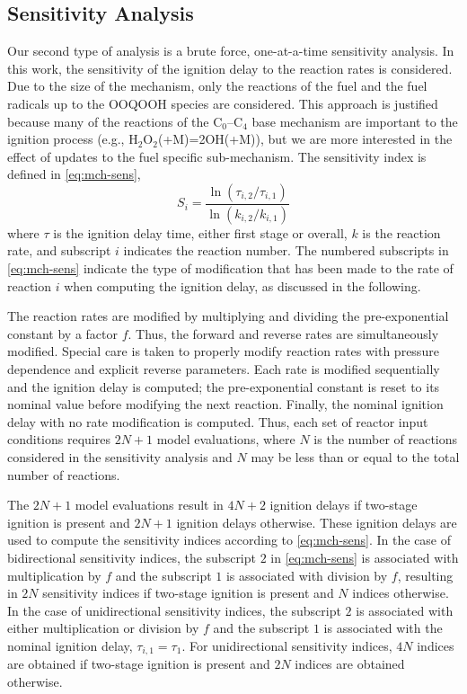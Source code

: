 \documentclass[../main.tex]{subfiles}
\begin{document}
\subsection{Sensitivity Analysis}
\label{sec:mch-sensitivity-analysis}

Our second type of analysis is a brute force, one-at-a-time sensitivity
analysis. In this work, the sensitivity of the ignition delay to the reaction
rates is considered. Due to the size of the mechanism, only the reactions of
the fuel and the fuel radicals up to the OOQOOH species are considered. This
approach is justified because many of the reactions of the C$_0$--C$_4$ base
mechanism are important to the ignition process (e.g.,
H$_2$O$_2$(+M)=2OH(+M)), but we are more interested in the effect of updates to
the fuel specific sub-mechanism. The sensitivity index is defined in
\cref{eq:mch-sens},
%
\begin{equation}
    \label{eq:mch-sens}
    S_i = \frac{\ln\left(\tau_{i,2}/\tau_{i,1}\right)}{\ln\left(k_{i,2}/k_{i,1}\right)}
\end{equation}
%
where $\tau$ is the ignition delay time, either first stage or overall, $k$ is
the reaction rate, and subscript $i$ indicates the reaction number. The
numbered subscripts in \cref{eq:mch-sens} indicate the type of modification
that has been made to the rate of reaction $i$ when computing the ignition
delay, as discussed in the following.

The reaction rates are modified by multiplying and dividing the pre-exponential
constant by a factor $f$. Thus, the forward and reverse rates are
simultaneously modified. Special care is taken to properly modify reaction
rates with pressure dependence and explicit reverse parameters. Each rate is
modified sequentially and the ignition delay is computed; the pre-exponential
constant is reset to its nominal value before modifying the next reaction.
Finally, the nominal ignition delay with no rate modification is computed.
Thus, each set of reactor input conditions requires $2N+1$ model evaluations,
where $N$ is the number of reactions considered in the sensitivity analysis
and $N$ may be less than or equal to the total number of reactions.

The $2N+1$ model evaluations result in $4N+2$ ignition delays if two-stage
ignition is present and $2N+1$ ignition delays otherwise. These ignition delays
are used to compute the sensitivity indices according to \cref{eq:mch-sens}.
In the case of bidirectional sensitivity indices, the subscript $2$ in
\cref{eq:mch-sens} is associated with multiplication by $f$ and the subscript
$1$ is associated with division by $f$, resulting in $2N$ sensitivity indices if
two-stage ignition is present and $N$ indices otherwise. In the case of
unidirectional sensitivity indices, the subscript $2$ is associated with either
multiplication or division by $f$ and the subscript $1$ is associated with the
nominal ignition delay, $\tau_{i,1}=\tau_1$. For unidirectional sensitivity
indices, $4N$ indices are obtained if two-stage ignition is present and
$2N$ indices are obtained otherwise.
\end{document}
